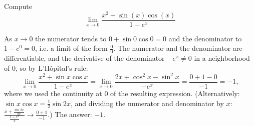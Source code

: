
\begin{question}
Compute
\[ \lim_{x\to 0} \frac{x^2+\sin(x)\cos(x)}{1-e^x} \]
\end{question}

\begin{solution}
As $x\to0$ the numerator tends to $0+\sin0\cos0=0$ and the denominator to $1-e^0=0$, i.e. a limit of the form $\frac00$. The numerator and the denominator are differentiable, and the derivative of the denominator $-e^x\neq0$ in a neighborhood of $0$, so by L'Hôpital's rule:
\[ \lim_{x\to0}\frac{x^2+\sin x\cos x}{1-e^x}=\lim_{x\to0}\frac{2x+\cos^2x-\sin^2x}{-e^x}=\frac{0+1-0}{-1}=-1, \]
where we used the continuity at $0$ of the resulting expression. (Alternatively: $\sin x\cos x=\frac12\sin2x$, and dividing the numerator and denominator by $x$: $\frac{x+\frac{\sin 2x}{2x}}{\frac{1-e^x}{x}}\to\frac{0+1}{-1}$.)
The answer: $\boxed{-1}$.
\end{solution}
